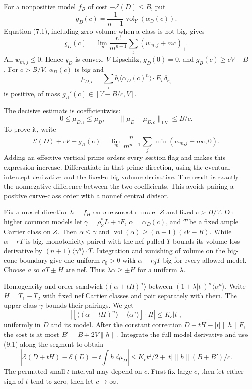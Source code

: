 \documentclass[
  10pt,
]{article}
\begin{document}
For a nonpositive model \(f_D\) of cost \(-\mathscr E(D)\leq B\), put
\[g_D(c)=\frac1{n+1}\operatorname{vol}_Y(\alpha_D(c)).\] Equation (7.1),
including zero volume when a class is not big, gives
\[g_D(c)=\lim_m\frac{n!}{m^{n+1}}
\sum_j(w_{m,j}+mc)_+.\] All \(w_{m,j}\leq0\). Hence \(g_D\) is convex,
\(V\)-Lipschitz, \(g_D(0)=0\), and \(g_D(c)\geq cV-B\). For \(c>B/V\),
\(\alpha_D(c)\) is big and
\[\mu_{D,c}=\sum_i b_i\langle\alpha_D(c)^n\rangle\cdot E_i\,\delta_{x_i}\]
is positive, of mass \(g_D'(c)\in[V-B/c,V]\).

The decisive estimate is coefficientwise: \[0\leq\mu_{D,c}\leq\mu_D,
\qquad\|\mu_D-\mu_{D,c}\|_{\mathrm{TV}}\leq B/c.\tag{9.1}\] To prove it,
write \[\mathscr E(D)+cV-g_D(c)
=\lim_m\frac{n!}{m^{n+1}}\sum_j\min(w_{m,j}+mc,0).\] Adding an effective
vertical prime orders every section flag and makes this expression
increase. Differentiate in that prime direction, using the eventual
intercept derivative and the fixed-\(c\) big volume derivative. The
result is exactly the nonnegative difference between the two
coefficients. This avoids pairing a positive curve-class order with a
nonnef central divisor.

Fix a model direction \(h=f_H\) on one smooth model \(Z\) and fixed
\(c>B/V\). On higher common models let \(\gamma=\rho_Z^*L+cF\),
\(\alpha=\alpha_D(c)\), and \(T\) be a fixed ample Cartier class on
\(Z\). Then \(\alpha\leq\gamma\) and
\(\operatorname{vol}(\alpha)\geq(n+1)(cV-B)\). While \(\alpha-rT\) is
big, monotonicity paired with the nef pulled \(T\) bounds its
volume-loss derivative by \((n+1)\langle\gamma^n\rangle\cdot T\).
Integration and vanishing of volume on the big-cone boundary give one
uniform \(r_0>0\) with \(\alpha-r_0T\) big for every allowed model.
Choose \(a\) so \(aT\pm H\) are nef. Thus \(\lambda\alpha\geq\pm H\) for
a uniform \(\lambda\).

Homogeneity and order sandwich \(\langle(\alpha+tH)^n\rangle\) between
\((1\pm\lambda|t|)^n\langle\alpha^n\rangle\). Write \(H=T_1-T_2\) with
fixed nef Cartier classes and pair separately with them. The upper class
\(\gamma\) bounds their pairings. We get
\[|[\langle(\alpha+tH)^n\rangle-\langle\alpha^n\rangle]\cdot H|
\leq K_c|t|,\] uniformly in \(D\) and its model. After the constant
correction \(D+tH-|t|\|h\|F\), the cost is at most \(B'=B+2V\|h\|\).
Integrate the full model derivative and use (9.1) along the segment to
obtain \[|\mathscr E(D+tH)-\mathscr E(D)-t\!\int h\,d\mu_D|
\leq K_ct^2/2+|t|\|h\|(B+B')/c.\tag{9.2}\] The permitted small \(t\)
interval may depend on \(c\). First fix large \(c\), then let either
sign of \(t\) tend to zero, then let \(c\to\infty\).
\end{document}
